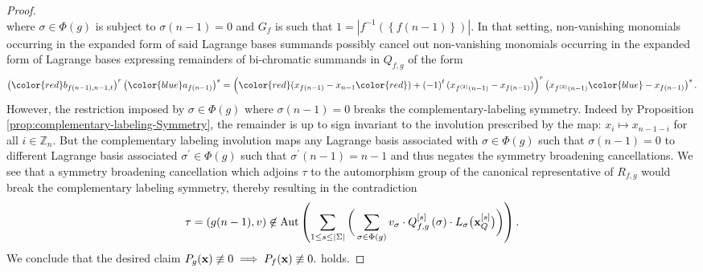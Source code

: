 \begin{proof}
\[\]
where $\sigma\in\Phi(g)$
is subject to $\sigma\left(n-1\right)=0$ and $G_{f}$ is such that
$1=\left|f^{-1}\left(\left\{ f\left(n-1\right)\right\} \right)\right|$.
In that setting, non-vanishing monomials occurring in the expanded
form of said Lagrange bases summands possibly cancel out non-vanishing
monomials occurring in the expanded form of Lagrange bases expressing
remainders of bi-chromatic summands in $Q_{f,g}$ of the form
\[
\left({\color{red}b_{f(n-1),n-1,t}}\right)^{r}\left({\color{blue}a_{f\left(n-1\right)}}\right)^{s}=\left({\color{red}(x_{f\left(n-1\right)}}-x_{n-1}{\color{red})}+\left(-1\right)^{t}(x_{f^{(2)}\left(n-1\right)}-x_{f\left(n-1\right)})\right)^{r}\left(x_{f^{\left(2\right)}\left(n-1\right)}{\color{blue}-x_{f\left(n-1\right)}}\right)^{s}.
\]
However, the restriction imposed by
$\sigma\in\Phi(g)$ where $\sigma\left(n-1\right)=0$ breaks the complementary-labeling
symmetry. Indeed by Proposition \ref{prop:complementary-labeling-Symmetry}, the remainder
is up to sign invariant to the involution prescribed by the map: $x_{i}\mapsto x_{n-1-i}$
for all $i\in\mathbb{Z}_{n}$. But the complementary labeling involution
maps any Lagrange basis associated with $\sigma\in\Phi(g) $
such that $\sigma\left(n-1\right)=0$ to different Lagrange basis
associated $\sigma^{\prime}\in\Phi(g) $
such that $\sigma^{\prime}\left(n-1\right)=n-1$ and thus negates
the symmetry broadening cancellations. We see that a symmetry
broadening cancellation which adjoins $\tau$ to the automorphism
group of the canonical representative of $R_{f,g}$ would break the
complementary labeling symmetry, thereby resulting in the contradiction
\[
\tau=\left(g(n-1),v\right) \not\in\text{Aut}\left(\sum_{1\leq s\leq\left|\Sigma\right|}\bigg(\sum_{\sigma\in\Phi(g)}v_{\sigma}\cdot Q_{f,g}^{\left[s\right]}\left(\sigma\right)\cdot L_{\sigma}\big({\bf x}_{Q}^{\left[s\right]}\big)\bigg)\right).
\]
We conclude that the desired claim $P_g ({\bf x}) \not\equiv 0  \implies  P_{f} ({\bf x}) \not\equiv 0.$
holds.
\end{proof}

